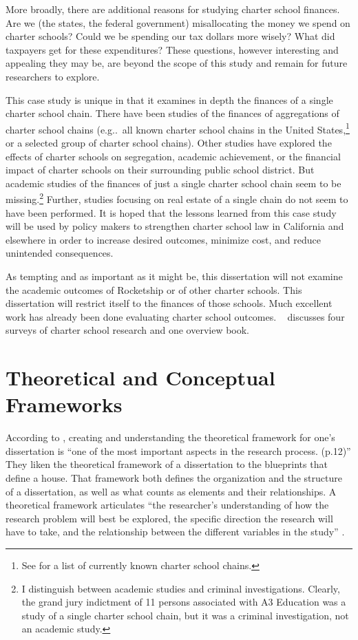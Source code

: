 More broadly, there are additional reasons for studying charter school finances. Are we (the states, the federal government) misallocating the money we spend on charter schools? Could we be spending our tax dollars more wisely? What did taxpayers get for these expenditures? These questions, however interesting and appealing they may be, are beyond the scope of this study and remain for future researchers to explore.

This case study is unique in that it examines in depth the finances of a single charter school chain. There have been studies of the finances of aggregations of charter school chains (e.g..~all known charter school chains in the United States,\footnote{See \textcite{Miron.etal2021} for a list of currently known charter school chains.} or a selected group of charter school chains). Other studies have explored the effects of charter schools on segregation, academic achievement, or the financial impact of charter schools on their surrounding public school district. But academic studies of the finances of just a single charter school chain seem to be missing.\footnote{I distinguish between academic studies and criminal investigations. Clearly, the grand jury indictment of 11 persons associated with A3 Education was a study of a single charter school chain, but it was a criminal investigation, not an academic study.} Further, studies focusing on real estate of a single chain do not seem to have been performed. It is hoped that the lessons learned from this case study will be used by policy makers to strengthen charter school law in California and elsewhere in order to increase desired outcomes, minimize cost, and reduce unintended consequences.

As tempting and as important as it might be, this dissertation will not examine the academic outcomes of Rocketship or of other charter schools. This dissertation will restrict itself to the finances of those schools. Much excellent work has already been done evaluating charter school outcomes. ~ discusses four surveys of charter school research and one overview book. 

\section{Theoretical and Conceptual Frameworks}\indent

According to \textcite{Grant.Osanloo2014}, creating and understanding the theoretical framework for one's dissertation is ``one of the most important aspects in the research process. (p.12)'' They liken the theoretical framework of a dissertation to the blueprints that define a house. That framework both defines the organization and the structure of a dissertation, as well as what counts as elements and their relationships. A theoretical framework articulates ``the researcher's understanding of how the research problem will best be explored, the specific direction the research will have to take, and the relationship between the different variables in the study'' \parencite[16–17]{Grant.Osanloo2014}. %

